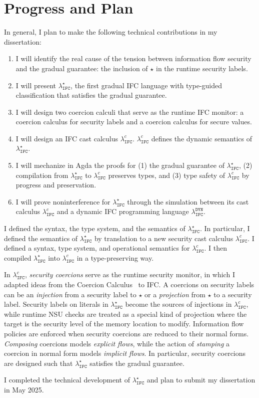 \documentclass[10pt, letterpaper]{article}
\newcommand{\Surface}{\ensuremath{\lambda_{\mathtt{IFC}}^\star}\xspace}
\newcommand{\CC}{\ensuremath{\lambda_{\mathtt{IFC}}^{c}}\xspace}
\newcommand{\DynIFC}{\ensuremath{\lambda_{\mathtt{IFC}}^{\mathtt{DYN}}}\xspace}
\newcommand{\key}[1]{\ensuremath{\mathtt{#1}}}
\newcommand{\unk}{\key{\star}\xspace}
\begin{document}
\section{Progress and Plan}
\label{sec:progress-and-plan}

In general, I plan to make the following technical contributions in my
dissertation:

\begin{enumerate}
\item I will identify the real cause of the tension between information flow
  security and the gradual guarantee: the inclusion of \unk in the runtime
  security labels.
\item I will present \Surface, the first gradual IFC language with type-guided
  classification that satisfies the gradual guarantee.
\item I will design two coercion calculi that serve as the runtime IFC monitor:
  a coercion calculus for security labels and a coercion calculus for secure
  values.
\item I will design an IFC cast calculus \CC. \CC defines the dynamic semantics
  of \Surface.
\item I will mechanize in Agda the proofs for (1) the gradual guarantee of
  \Surface, (2) compilation from \Surface to \CC preserves types, and (3) type
  safety of \CC by progress and preservation.
\item I will prove noninterference for \Surface through the simulation between
  its cast calculus \CC and a dynamic IFC programming language \DynIFC.
\end{enumerate}

I defined the syntax, the type system, and the semantics of \Surface. In
particular, I defined the semantics of \Surface by translation to a new security
cast calculus \CC. I defined a syntax, type system, and operational semantics
for \CC. I then compiled \Surface into \CC in a type-preserving way.

In \CC, \textit{security coercions} serve as the runtime security monitor, in
which I adapted ideas from the Coercion
Calculus~\citep{Henglein:1994nz,Herman:2010aa} to IFC. A coercions on
security labels can be an \textit{injection} from a security label to \unk or a
\textit{projection} from \unk to a security label. Security labels on literals
in \Surface become the sources of injections in \CC, while runtime NSU checks
are treated as a special kind of projection where the target is the security
level of the memory location to modify. Information flow policies are enforced
when security coercions are reduced to their normal forms. \textit{Composing}
coercions models \textit{explicit flows}, while the action of \textit{stamping}
a coercion in normal form models \textit{implicit flows}. In particular,
security coercions are designed such that \Surface satisfies the gradual
guarantee.

I completed the technical development of \Surface and plan to submit my
dissertation in May 2025.

\clearpage


\end{document}
